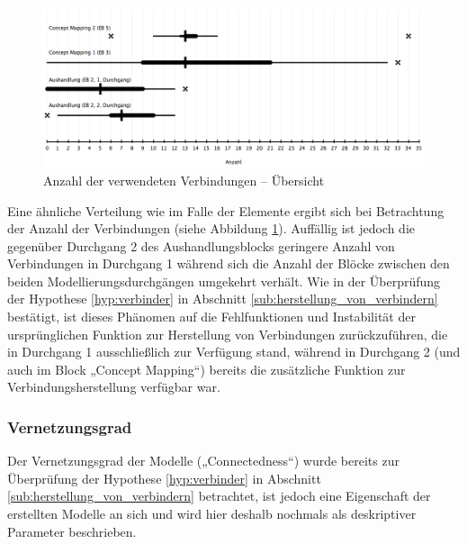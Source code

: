 \begin{figure}[htbp]
	\centering
		\includegraphics[width=15cm]{img/Evaluierung/elementUsageConnectorsOverview.png}
	\caption{Anzahl der verwendeten Verbindungen -- Übersicht}
	\label{fig:img_Evaluierung_elementUsageConnectorsOverview}
\end{figure}

Eine ähnliche Verteilung wie im Falle der Elemente ergibt sich bei Betrachtung der Anzahl der Verbindungen (siehe Abbildung \ref{fig:img_Evaluierung_elementUsageConnectorsOverview}). Auffällig ist jedoch die gegenüber Durchgang 2 des Aushandlungsblocks geringere Anzahl von Verbindungen in Durchgang 1 während sich die Anzahl der Blöcke zwischen den beiden Modellierungsdurchgängen umgekehrt verhält. Wie in der Überprüfung der Hypothese \ref{hyp:verbinder} in Abschnitt \ref{sub:herstellung_von_verbindern} bestätigt, ist dieses Phänomen auf die Fehlfunktionen und Instabilität der ursprünglichen Funktion zur Herstellung von Verbindungen zurückzuführen, die in Durchgang 1 ausschließlich zur Verfügung stand, während in Durchgang 2 (und auch im Block „Concept Mapping“) bereits die zusätzliche Funktion zur Verbindungsherstellung verfügbar war.


\subsubsection{Vernetzungsgrad} %
\label{ssub:vernetzungsgrad}

Der Vernetzungsgrad der Modelle („Connectedness“) wurde bereits zur Überprüfung der Hypothese \ref{hyp:verbinder} in Abschnitt \ref{sub:herstellung_von_verbindern} betrachtet, ist jedoch eine Eigenschaft der erstellten Modelle an sich und wird hier deshalb nochmals als deskriptiver Parameter beschrieben.

